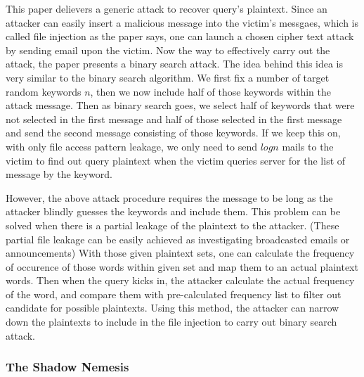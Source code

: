 \documentclass[a4paper]{article}
\begin{document}
This paper delievers a generic attack to recover query's plaintext. Since an attacker can easily insert a malicious message into the victim's messgaes, which is called file injection as the paper says, one can launch a chosen cipher text attack by sending email upon the victim. Now the way to effectively carry out the attack, the paper presents a binary search attack. The idea behind this idea is very similar to the binary search algorithm. We first fix a number of target random keywords $n$, then we now include half of those keywords within the attack message. Then as binary search goes, we select half of keywords that were not selected in the first message and half of those selected in the first message and send the second message consisting of those keywords. If we keep this on, with only file access pattern leakage, we only need to send $log n$ mails to the victim to find out query plaintext when the victim queries server for the list of message by the keyword.
\par However, the above attack procedure requires the message to be long as the attacker blindly guesses the keywords and include them. This problem can be solved when there is a partial leakage of the plaintext to the attacker. (These partial file leakage can be easily achieved as investigating broadcasted emails or announcements) With those given plaintext sets, one can calculate the frequency of occurence of those words within given set and map them to an actual plaintext words. Then when the query kicks in, the attacker calculate the actual frequency of the word, and compare them with pre-calculated frequency list to filter out candidate for possible plaintexts. Using this method, the attacker can narrow down the plaintexts to include in the file injection to carry out binary search attack.

\subsubsection*{The Shadow Nemesis}
\end{document}
